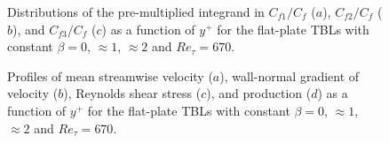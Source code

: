\begin{figure}
\subfigure{\texttt{[image: 2a]}\label{beta1:a}}
\subfigure{\texttt{[image: 2b]}\label{beta1:b}}
\subfigure{\texttt{[image: 2c]}\label{beta1:c}}
\caption{Distributions of the pre-multiplied integrand in $C_{f1}/C_f$ ($a$), $C_{f2}/C_f$ ($b$), and $C_{f3}/C_f$ ($c$) as a function of $y^+$ for the flat-plate TBLs with constant $\beta=0$, $\approx1$, $\approx2$ and $Re_\tau=670$.}
\label{beta1}
\end{figure}


\begin{figure}
\subfigure{\texttt{[image: 3a]}\label{prof:a}}
\subfigure{\texttt{[image: 3b]}\label{prof:b}}
\subfigure{\texttt{[image: 3c]}\label{prof:c}}
\subfigure{\texttt{[image: 3d]}\label{prof:d}}
\caption{{\color{black}Profiles of mean streamwise velocity ($a$), wall-normal gradient of velocity ($b$), Reynolds shear stress ($c$), and production ($d$) as a function of $y^+$ for the flat-plate TBLs with constant $\beta=0$, $\approx1$, $\approx2$ and $Re_\tau=670$.}}
\label{prof}
\end{figure}



